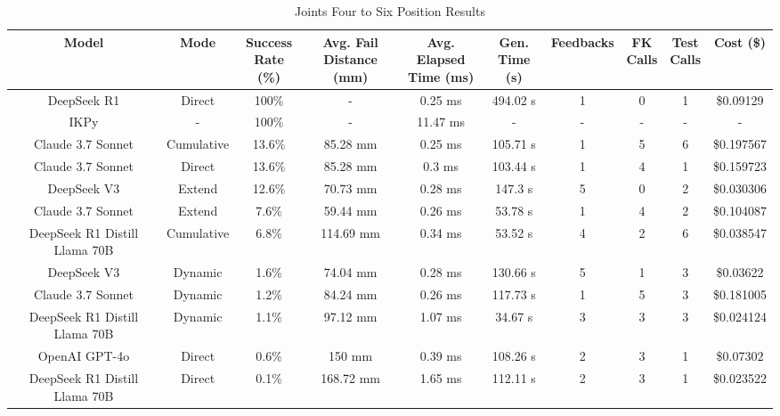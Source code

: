\begin{landscape}
\begin{table}[H]
\tiny
\renewcommand{\arraystretch}{1.2}
\caption{Joints Four to Six Position Results}
\begin{center}
\begin{tabular}{|c|c|c|c|c|c|c|c|c|c|}
    \hline
    \textbf{Model} & 
    \textbf{Mode} & 
    \makecell{\textbf{Success}\\\textbf{Rate (\%)}} &
    \makecell{\textbf{Avg. Fail}\\\textbf{Distance (mm)}} &
    \makecell{\textbf{Avg. Elapsed}\\\textbf{Time (ms)}} &
    \makecell{\textbf{Gen.}\\\textbf{Time (s)}} &
    \textbf{Feedbacks} &
    \makecell{\textbf{FK}\\\textbf{Calls}} &
    \makecell{\textbf{Test}\\\textbf{Calls}} &
    \textbf{Cost (\$)} \\
    \hline
    DeepSeek R1 & Direct & 100\% & - & 0.25 ms & 494.02 s & 1 & 0 & 1 & \$0.09129 \\
    \hline
    IKPy & - & 100\% & - & 11.47 ms & - & - & - & - & - \\
    \hline
    Claude 3.7 Sonnet & Cumulative & 13.6\% & 85.28 mm & 0.25 ms & 105.71 s & 1 & 5 & 6 & \$0.197567 \\
    \hline
    Claude 3.7 Sonnet & Direct & 13.6\% & 85.28 mm & 0.3 ms & 103.44 s & 1 & 4 & 1 & \$0.159723 \\
    \hline
    DeepSeek V3 & Extend & 12.6\% & 70.73 mm & 0.28 ms & 147.3 s & 5 & 0 & 2 & \$0.030306 \\
    \hline
    Claude 3.7 Sonnet & Extend & 7.6\% & 59.44 mm & 0.26 ms & 53.78 s & 1 & 4 & 2 & \$0.104087 \\
    \hline
    DeepSeek R1 Distill Llama 70B & Cumulative & 6.8\% & 114.69 mm & 0.34 ms & 53.52 s & 4 & 2 & 6 & \$0.038547 \\
    \hline
    DeepSeek V3 & Dynamic & 1.6\% & 74.04 mm & 0.28 ms & 130.66 s & 5 & 1 & 3 & \$0.03622 \\
    \hline
    Claude 3.7 Sonnet & Dynamic & 1.2\% & 84.24 mm & 0.26 ms & 117.73 s & 1 & 5 & 3 & \$0.181005 \\
    \hline
    DeepSeek R1 Distill Llama 70B & Dynamic & 1.1\% & 97.12 mm & 1.07 ms & 34.67 s & 3 & 3 & 3 & \$0.024124 \\
    \hline
    OpenAI GPT-4o & Direct & 0.6\% & 150 mm & 0.39 ms & 108.26 s & 2 & 3 & 1 & \$0.07302 \\
    \hline
    DeepSeek R1 Distill Llama 70B & Direct & 0.1\% & 168.72 mm & 1.65 ms & 112.11 s & 2 & 3 & 1 & \$0.023522 \\

\end{tabular}
\end{center}
\end{table}
\end{landscape}
